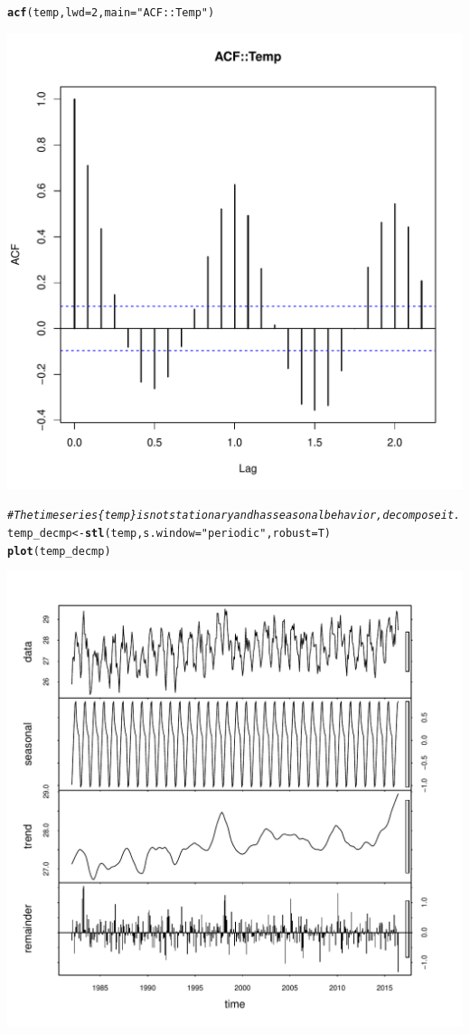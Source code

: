 \documentclass[10pt]{article}\usepackage[]{graphicx}\usepackage[]{color}
\makeatletter
\def\maxwidth{ %
  \ifdim\Gin@nat@width>\linewidth
    \linewidth
  \else
    \Gin@nat@width
  \fi
}
\newcommand{\hlnum}[1]{\textcolor[rgb]{0.686,0.059,0.569}{#1}}%
\newcommand{\hlstr}[1]{\textcolor[rgb]{0.192,0.494,0.8}{#1}}%
\newcommand{\hlcom}[1]{\textcolor[rgb]{0.678,0.584,0.686}{\textit{#1}}}%
\newcommand{\hlstd}[1]{\textcolor[rgb]{0.345,0.345,0.345}{#1}}%
\newcommand{\hlkwb}[1]{\textcolor[rgb]{0.69,0.353,0.396}{#1}}%
\newcommand{\hlkwc}[1]{\textcolor[rgb]{0.333,0.667,0.333}{#1}}%
\newcommand{\hlkwd}[1]{\textcolor[rgb]{0.737,0.353,0.396}{\textbf{#1}}}%
\newenvironment{kframe}{%
 \def\at@end@of@kframe{}%
 \ifinner\ifhmode%
  \def\at@end@of@kframe{\end{minipage}}%
  \begin{minipage}{\columnwidth}%
 \fi\fi%
 \def\FrameCommand##1{\hskip\@totalleftmargin \hskip-\fboxsep
 \colorbox{shadecolor}{##1}\hskip-\fboxsep
     \hskip-\linewidth \hskip-\@totalleftmargin \hskip\columnwidth}%
 \MakeFramed {\advance\hsize-\width
   \@totalleftmargin\z@ \linewidth\hsize
   \@setminipage}}%
 {\par\unskip\endMakeFramed%
 \at@end@of@kframe}
\newenvironment{knitrout}{}{} %
\makeatother
\begin{document}
\begin{knitrout}
\begin{kframe}
\begin{alltt}
\hlkwd{acf}\hlstd{(temp,}\hlkwc{lwd} \hlstd{=} \hlnum{2} \hlstd{,} \hlkwc{main} \hlstd{=} \hlstr{"ACF::Temp"}\hlstd{)}
\end{alltt}
\end{kframe}
\includegraphics[width=\maxwidth]{figure/unnamed-chunk-24-2} 
\begin{kframe}\begin{alltt}
\hlcom{#The time series \{temp\} is not stationary and has seasonal behavior, decompose it.}
\hlstd{temp_decmp} \hlkwb{<-}\hlkwd{stl}\hlstd{(temp,}\hlkwc{s.window} \hlstd{=} \hlstr{"periodic"}\hlstd{,} \hlkwc{robust} \hlstd{= T)}
\hlkwd{plot}\hlstd{(temp_decmp)}
\end{alltt}
\end{kframe}
\includegraphics[width=\maxwidth]{figure/unnamed-chunk-24-3} 

\end{knitrout}
\end{document}

